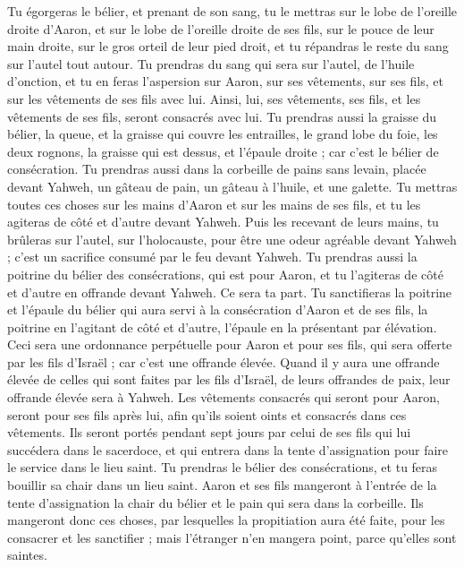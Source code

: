 \begin{multicols}{2}
Tu égorgeras le bélier, et prenant de son sang, tu le mettras sur le lobe de l'oreille droite d'Aaron, et sur le lobe de l'oreille droite de ses fils, sur le pouce de leur main droite, sur le gros orteil de leur pied droit, et tu répandras le reste du sang sur l'autel tout autour.
Tu prendras du sang qui sera sur l'autel, de l'huile d'onction, et tu en feras l’aspersion sur Aaron, sur ses vêtements, sur ses fils, et sur les vêtements de ses fils avec lui. Ainsi, lui, ses vêtements, ses fils, et les vêtements de ses fils, seront consacrés avec lui.
Tu prendras aussi la graisse du bélier, la queue, et la graisse qui couvre les entrailles, le grand lobe du foie, les deux rognons, la graisse qui est dessus, et l'épaule droite ; car c'est le bélier de consécration.
Tu prendras aussi dans la corbeille de pains sans levain, placée devant Yahweh, un gâteau de pain, un gâteau à l'huile, et une galette.
Tu mettras toutes ces choses sur les mains d’Aaron et sur les mains de ses fils, et tu les agiteras de côté et d’autre devant Yahweh.
Puis les recevant de leurs mains, tu brûleras sur l'autel, sur l'holocauste, pour être une odeur agréable devant Yahweh ; c'est un sacrifice consumé par le feu devant Yahweh.
Tu prendras aussi la poitrine du bélier des consécrations, qui est pour Aaron, et tu l’agiteras de côté et d’autre en offrande devant Yahweh. Ce sera ta part.
Tu sanctifieras la poitrine et l’épaule du bélier qui aura servi à la consécration d’Aaron et de ses fils, la poitrine en l’agitant de côté et d’autre, l’épaule en la présentant par élévation.
Ceci sera une ordonnance perpétuelle pour Aaron et pour ses fils, qui sera offerte par les fils d'Israël ; car c'est une offrande élevée. Quand il y aura une offrande élevée de celles qui sont faites par les fils d'Israël, de leurs offrandes de paix, leur offrande élevée sera à Yahweh.
Les vêtements consacrés qui seront pour Aaron, seront pour ses fils après lui, afin qu'ils soient oints et consacrés dans ces vêtements.
Ils seront portés pendant sept jours par celui de ses fils qui lui succédera dans le sacerdoce, et qui entrera dans la tente d’assignation pour faire le service dans le lieu saint.
Tu prendras le bélier des consécrations, et tu feras bouillir sa chair dans un lieu saint.
Aaron et ses fils mangeront à l'entrée de la tente d'assignation la chair du bélier et le pain qui sera dans la corbeille.
Ils mangeront donc ces choses, par lesquelles la propitiation aura été faite, pour les consacrer et les sanctifier ; mais l'étranger n'en mangera point, parce qu'elles sont saintes.

\end{multicols}
